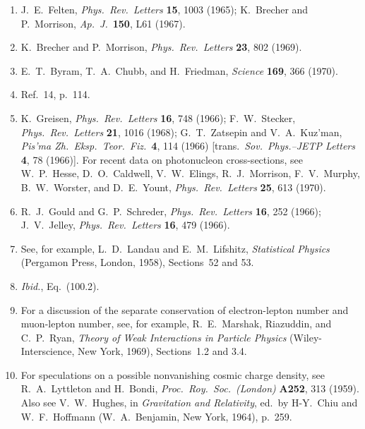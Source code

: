\begin{enumerate}
  \item{}\label{ch15-ref-81}
  J.~E.~Felten, \emph{Phys.\ Rev.\ Letters} \textbf{15}, 1003 (1965);
  K.~Brecher and P.~Morrison,
  \emph{Ap.\ J.}\ \textbf{150}, L61 (1967).

  \item{}\label{ch15-ref-82}
  K.~Brecher and P.~Morrison,
  \emph{Phys.\ Rev.\ Letters} \textbf{23}, 802 (1969).

  \item{}\label{ch15-ref-83}
  E.~T.~Byram, T.~A.~Chubb, and H.~Friedman,
  \emph{Science} \textbf{169}, 366 (1970).

  \item{}\label{ch15-ref-84}
  Ref.~14, p.~114.

  \item{}\label{ch15-ref-85}
  K.~Greisen, \emph{Phys.\ Rev.\ Letters} \textbf{16}, 748 (1966);
  F.~W.~Stecker, \emph{Phys.\ Rev.\ Letters} \textbf{21}, 1016 (1968);
  G.~T.~Zatsepin and V.~A.~Kuz'man,
  \emph{Pis'ma Zh.\ Eksp.\ Teor.\ Fiz.}\ \textbf{4}, 114 (1966)
  [trans.\ \emph{Sov.\ Phys.--JETP Letters} \textbf{4}, 78 (1966)].
  For recent data on photonucleon cross-sections, see W.~P.~Hesse,
  D.~O.~Caldwell, V.~W.~Elings, R.~J.~Morrison, F.~V.~Murphy,
  B.~W.~Worster, and D.~E.~Yount,
  \emph{Phys.\ Rev.\ Letters} \textbf{25}, 613 (1970).

  \item{}\label{ch15-ref-86}
  R.~J.~Gould and G.~P.~Schreder,
  \emph{Phys.\ Rev.\ Letters} \textbf{16}, 252 (1966);
  J.~V.~Jelley, \emph{Phys.\ Rev.\ Letters} \textbf{16}, 479 (1966).

  \item{}\label{ch15-ref-87}
  See, for example, L.~D.~Landau and E.~M.~Lifshitz,
  \emph{Statistical Physics} (Pergamon Press, London, 1958),
  Sections~52 and 53.

  \item{}\label{ch15-ref-88}
  \emph{Ibid.}, Eq.~(100.2).

  \item{}\label{ch15-ref-89}
  For a discussion of the separate conservation of electron-lepton number
  and muon-lepton number, see, for example, R.~E.~Marshak, Riazuddin,
  and C.~P.~Ryan, \emph{Theory of Weak Interactions in Particle Physics}
  (Wiley-Interscience, New York, 1969), Sections~1.2 and 3.4.

  \item{}\label{ch15-ref-90}
  For speculations on a possible nonvanishing cosmic charge density, see
  R.~A.~Lyttleton and H.~Bondi,
  \emph{Proc.\ Roy.\ Soc.\ (London)} \textbf{A252}, 313 (1959).
  Also see V.~W.~Hughes, in \emph{Gravitation and Relativity},
  ed.\ by H-Y.~Chiu and W.~F.~Hoffmann
  (W.~A.~Benjamin, New York, 1964), p.~259.


\end{enumerate}
